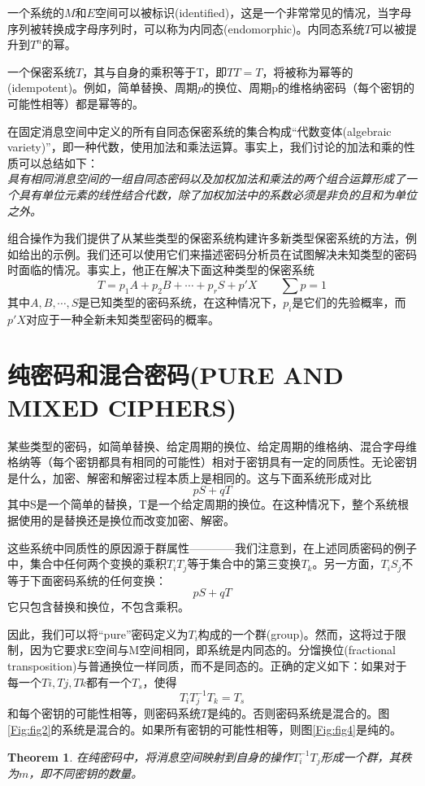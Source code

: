 \documentclass[]{article}
\newtheorem{theorem}{Theorem}
\begin{document}
一个系统的$M$和$E$空间可以被标识(identified)，这是一个非常常见的情况，当字母序列被转换成字母序列时，可以称为内同态(endomorphic)。内同态系统$T$可以被提升到$T^n$的幂。

一个保密系统$T$，其与自身的乘积等于T，即$TT=T$，将被称为幂等的(idempotent)。例如，简单替换、周期$p$的换位、周期p的维格纳密码（每个密钥的可能性相等）都是幂等的。

在固定消息空间中定义的所有自同态保密系统的集合构成“代数变体(algebraic variety)”，即一种代数，使用加法和乘法运算。事实上，我们讨论的加法和乘的性质可以总结如下：\\
\textsl{具有相同消息空间的一组自同态密码以及加权加法和乘法的两个组合运算形成了一个具有单位元素的线性结合代数，除了加权加法中的系数必须是非负的且和为单位之外。}

组合操作为我们提供了从某些类型的保密系统构建许多新类型保密系统的方法，例如给出的示例。我们还可以使用它们来描述密码分析员在试图解决未知类型的密码时面临的情况。事实上，他正在解决下面这种类型的保密系统
\[T=p_1A+p_2B+\cdots+p_rS+p'X \qquad \sum p=1\]
其中$A,B,\cdots,S$是已知类型的密码系统，在这种情况下，$p_i$是它们的先验概率，而$p'X$对应于一种全新未知类型密码的概率。


\section{纯密码和混合密码(PURE AND MIXED CIPHERS)}

某些类型的密码，如简单替换、给定周期的换位、给定周期的维格纳、混合字母维格纳等（每个密钥都具有相同的可能性）相对于密钥具有一定的同质性。无论密钥是什么，加密、解密和解密过程本质上是相同的。这与下面系统形成对比
\[pS+qT\]
其中S是一个简单的替换，T是一个给定周期的换位。在这种情况下，整个系统根据使用的是替换还是换位而改变加密、解密。

这些系统中同质性的原因源于群属性————我们注意到，在上述同质密码的例子中，集合中任何两个变换的乘积$T_iT_j$等于集合中的第三变换$T_k$。另一方面，$T_iS_j$不等于下面密码系统的任何变换：
\[pS+qT\]
它只包含替换和换位，不包含乘积。

因此，我们可以将“pure”密码定义为$T_i$构成的一个群(group)。然而，这将过于限制，因为它要求E空间与M空间相同，即系统是内同态的。分馏换位(fractional transposition)与普通换位一样同质，而不是同态的。正确的定义如下：如果对于每一个$Ti,Tj,Tk$都有一个$T_s$，使得
\[T_iT^{-1}_jT_k=T_s\]
和每个密钥的可能性相等，则密码系统$T$是纯的。否则密码系统是混合的。图\ref{Fig:fig2}的系统是混合的。如果所有密钥的可能性相等，则图\ref{Fig:fig4}是纯的。

\begin{theorem}
	在纯密码中，将消息空间映射到自身的操作$T^{-1}_i T_j$形成一个群，其秩为$m$，即不同密钥的数量。
\end{theorem}
\end{document}
